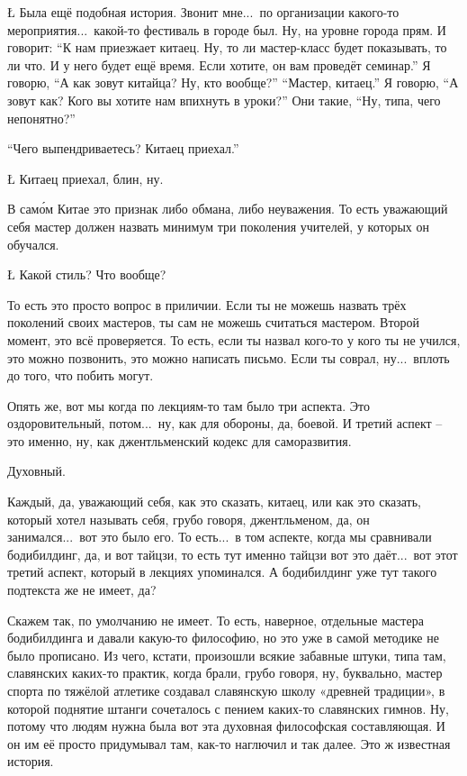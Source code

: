 \L
Была ещё подобная история.
Звонит мне...\
по организации какого-то мероприятия...\
какой-то фестиваль в городе был.
Ну, на уровне города прям.
И говорит: ``К нам приезжает
китаец. Ну, то ли
мастер-класс будет показывать, то ли что.
И у него будет ещё время.
Если хотите, он вам проведёт
семинар.'' Я говорю, ``А как зовут китайца?
Ну, кто вообще?''
``Мастер, китаец.''
Я говорю, ``А зовут как?
Кого вы хотите
нам впихнуть в уроки?''
Они такие, ``Ну,
типа, чего непонятно?''

\A
``Чего выпендриваетесь? Китаец приехал.''

\L
Китаец приехал, блин, ну.

\A
В сам\'ом Китае
это признак
либо обмана, либо
неуважения.
То есть уважающий себя мастер
должен назвать минимум
три поколения учителей, у которых он
обучался.

\L
Какой стиль? Что вообще?

\A
То есть это просто вопрос в приличии.
Если ты не можешь назвать трёх
поколений своих мастеров,
ты сам не можешь
считаться мастером.
Второй момент,
это всё проверяется.
То есть, если ты назвал кого-то у кого ты
не учился, это можно
позвонить, это можно написать письмо.
Если ты соврал, ну...\
вплоть до того, что побить могут.

\I
Опять же, вот мы когда по лекциям-то
там было три аспекта.
Это
оздоровительный, потом...\
ну, как для
обороны, да, боевой.
И третий аспект -- это
именно, ну, как
джентльменский
кодекс для саморазвития.

\A
Духовный.

\I
Каждый, да, уважающий
себя, как это сказать,
китаец, или как это сказать, который
хотел называть себя, грубо говоря,
джентльменом, да, он занимался...\
вот это
было его. То есть...\
в том аспекте,
когда мы сравнивали бодибилдинг,
да, и вот тайцзи, то есть
тут
именно тайцзи вот это даёт...\
вот этот третий
аспект, который в лекциях упоминался.
А бодибилдинг уже тут
такого подтекста же не имеет, да?

\A
Скажем так, по умолчанию
не имеет. То есть, наверное,
отдельные мастера бодибилдинга
и давали какую-то
философию, но это уже
в самой
методике не было прописано.
Из чего, кстати, произошли
всякие забавные штуки,
типа там, славянских
каких-то практик,
когда брали, грубо говоря,
ну, буквально,
мастер спорта по тяжёлой атлетике
создавал славянскую
школу
«древней традиции»,
в которой поднятие
штанги сочеталось с пением
каких-то славянских гимнов.
Ну, потому что
людям нужна была вот эта
духовная философская составляющая.
И он им её
просто придумывал
там, как-то
наглючил и так далее. Это ж известная
история.

